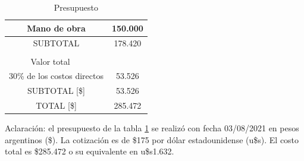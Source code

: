 \documentclass[
11pt, %
codirector, %
]{charter}
\begin{document}
\begin{table}[htpb]
{\begin{tabularx}{\linewidth}{@{}|p{1em}|X|X|X|X|@{}}
\multicolumn{4}{|c|}{Mano de obra} &
  \multicolumn{1}{c|}{150.000} \\ \hline 
  
\multicolumn{4}{|c|}{SUBTOTAL} &
  \multicolumn{1}{c|}{178.420} \\ \hline
\rowcolor[HTML]{C0C0C0} 
\multicolumn{5}{|c|}{\cellcolor[HTML]{CCFFFF}COSTOS INDIRECTOS [\$]} \\ \hline
\rowcolor[HTML]{C0C0C0} 
\multicolumn{4}{|c|}{Descripción} &
  \multicolumn{1}{c|}{\cellcolor[HTML]{B0B0B0}Valor total} \\ \hline
\multicolumn{4}{|c|}{30\% de los costos directos} &
  \multicolumn{1}{c|}{53.526} \\ \hline
  
\multicolumn{4}{|c|}{SUBTOTAL [\$]} &
  \multicolumn{1}{c|}{53.526} \\ \hline
\multicolumn{4}{|c|}{\cellcolor[HTML]{B0B0B0}TOTAL [\$]} &
  \multicolumn{1}{c|}{\cellcolor[HTML]{B0B0B0}285.472} \\ \hline   
\end{tabularx}
}
\caption{Presupuesto}
\label{tab:Presupuesto}
\end{table}


Aclaración: el presupuesto de la tabla \ref{tab:Presupuesto} se realizó con fecha 03/08/2021 en pesos argentinos (\$). La  cotización es de \$175 por dólar estadounidense (u\$s). El costo total es \$285.472 o su equivalente en u\$s1.632.

\vspace{40em}
\end{document}
